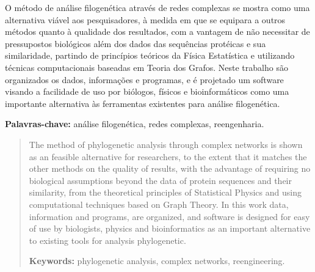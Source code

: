 \documentclass[normaltoc,capchap,capsec,times]{abnt}
\begin{document}



\begin{resumo}
O método de análise filogenética através de redes complexas se mostra como uma alternativa
viável aos pesquisadores, à medida em que se equipara a outros métodos quanto à qualidade dos
resultados, com a vantagem de não necessitar de pressupostos biológicos além dos dados das
sequências protéicas e sua similaridade, partindo de princípios teóricos da Física Estatística e
utilizando técnicas computacionais baseadas em Teoria dos Grafos. Neste trabalho são organizados
os dados, informações e programas, e é projetado um software visando a facilidade de uso por biólogos, 
físicos e bioinformáticos como uma importante alternativa às ferramentas existentes para análise
filogenética.

\textbf{Palavras-chave:}
análise filogenética,
redes complexas, 
reengenharia.
\end{resumo}

\begin{abstract}
The method of phylogenetic analysis through complex networks is shown as an feasible alternative 
for researchers, to the extent that it matches the other methods on the quality of
results, with the advantage of requiring no biological assumptions  beyond the data of
protein sequences and their similarity, from the theoretical principles of Statistical Physics and
using computational techniques based on Graph Theory. In this work data, information and programs,
are organized, and software is designed for easy of use by biologists, 
physics and bioinformatics as an important alternative to existing tools for analysis
phylogenetic.

\textbf{Keywords:} 
phylogenetic analysis,
complex networks,
reengineering.
\end{abstract}

\listadefiguras
\listadesiglas

\sumario







\end{document}
